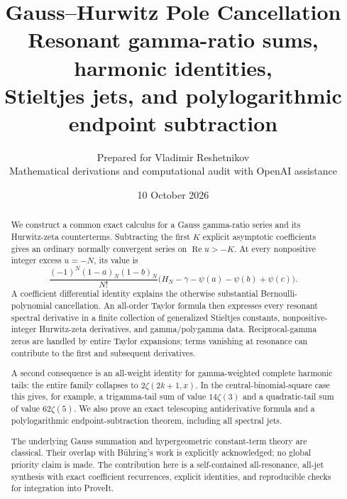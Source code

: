 \documentclass[11pt]{article}
\title{\textbf{Gauss--Hurwitz Pole Cancellation}\\[6pt]
\Large Resonant gamma-ratio sums, harmonic identities,\\
Stieltjes jets, and polylogarithmic endpoint subtraction}
\author{Prepared for Vladimir Reshetnikov\\
\small Mathematical derivations and computational audit with OpenAI assistance}
\date{10 October 2026}
\numberwithin{equation}{section}
\theoremstyle{definition}
\theoremstyle{remark}
\DeclareMathOperator{\Rea}{Re}
\begin{document}
\maketitle
\begin{abstract}
We construct a common exact calculus for a Gauss gamma-ratio series and its
Hurwitz-zeta counterterms.  Subtracting the first $K$ explicit asymptotic
coefficients gives an ordinary normally convergent series on
$\Rea u>-K$.  At every nonpositive integer excess $u=-N$, its value is
\[
 \frac{(-1)^N(1-a)_N(1-b)_N}{N!}
 \bigl(H_N-\gamma-\psi(a)-\psi(b)+\psi(c)\bigr).
\]
A coefficient differential identity explains the otherwise substantial
Bernoulli-polynomial cancellation.  An all-order Taylor formula then
expresses every resonant spectral derivative in a finite collection of
generalized Stieltjes constants, nonpositive-integer Hurwitz-zeta derivatives,
and gamma/polygamma data.  Reciprocal-gamma zeros are handled by entire
Taylor expansions; terms vanishing at resonance can contribute to the
first and subsequent derivatives.

A second consequence is an all-weight identity for gamma-weighted complete
harmonic tails: the entire family collapses to $2\zeta(2k+1,x)$.  In the
central-binomial-square case this gives, for example, a trigamma-tail sum
of value $14\zeta(3)$ and a quadratic-tail sum of value $62\zeta(5)$.
We also prove an exact telescoping antiderivative formula and a
polylogarithmic endpoint-subtraction theorem, including all spectral jets.

The underlying Gauss summation and hypergeometric constant-term theory are
classical.  Their overlap with B\"uhring's work is explicitly acknowledged;
no global priority claim is made.  The contribution here is a self-contained
all-resonance, all-jet synthesis with exact coefficient recurrences,
explicit identities, and reproducible checks for integration into ProveIt.
\end{abstract}
\thispagestyle{empty}
\clearpage
\tableofcontents
\clearpage









\appendix


\end{document}
